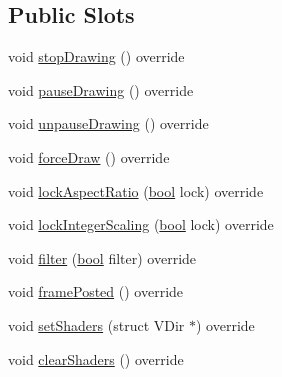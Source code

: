 \subsection*{Public Slots}
\begin{DoxyCompactItemize}
\item 
void \mbox{\hyperlink{class_q_g_b_a_1_1_display_qt_afa850c50104d2d53403ed9905e792973}{stop\+Drawing}} () override
\item 
void \mbox{\hyperlink{class_q_g_b_a_1_1_display_qt_ab214828ae75e0b06543da51056ec751d}{pause\+Drawing}} () override
\item 
void \mbox{\hyperlink{class_q_g_b_a_1_1_display_qt_a926a90bec92b14454b92aac8b5c1e071}{unpause\+Drawing}} () override
\item 
void \mbox{\hyperlink{class_q_g_b_a_1_1_display_qt_a3d2e6ebd22d799f9d92f9b53d19072a7}{force\+Draw}} () override
\item 
void \mbox{\hyperlink{class_q_g_b_a_1_1_display_qt_a21bdc1c0c76369848e567083f930ee4a}{lock\+Aspect\+Ratio}} (\mbox{\hyperlink{libretro_8h_a4a26dcae73fb7e1528214a068aca317e}{bool}} lock) override
\item 
void \mbox{\hyperlink{class_q_g_b_a_1_1_display_qt_afc071d5977e2451415f2f47689cdd350}{lock\+Integer\+Scaling}} (\mbox{\hyperlink{libretro_8h_a4a26dcae73fb7e1528214a068aca317e}{bool}} lock) override
\item 
void \mbox{\hyperlink{class_q_g_b_a_1_1_display_qt_a0360fcb35c09f0c48b22f9462d26cab0}{filter}} (\mbox{\hyperlink{libretro_8h_a4a26dcae73fb7e1528214a068aca317e}{bool}} filter) override
\item 
void \mbox{\hyperlink{class_q_g_b_a_1_1_display_qt_a49d1bedef7318112a9c7a0ab33be314e}{frame\+Posted}} () override
\item 
void \mbox{\hyperlink{class_q_g_b_a_1_1_display_qt_a60f60470997bb4c4c46ce9598d78e106}{set\+Shaders}} (struct V\+Dir $\ast$) override
\item 
void \mbox{\hyperlink{class_q_g_b_a_1_1_display_qt_a57bcaa20be047fc44d6a7da8e71b0cbe}{clear\+Shaders}} () override
\end{DoxyCompactItemize}
